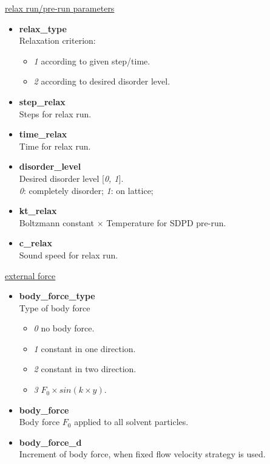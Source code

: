 \documentclass[a4paper,10pt]{article}
\begin{document}
\begin{center}
\underline{\textlangle relax run/pre-run parameters \textrangle}
\end{center}

\begin{itemize}
 
\item 
\textbf{relax\_type}  \\
Relaxation criterion:
\begin{itemize}
 \item 
\textit{1} according to given step/time.
 \item
\textit{2} according to desired disorder level.
\end{itemize}
\item 
\textbf{step\_relax}   \\
Steps for relax run.

\item 
\textbf{time\_relax}   \\
Time for relax run.

\item 
\textbf{disorder\_level} \\
Desired disorder level [\textit{0, 1}].\\
\textit{0}: completely disorder;
\textit{1}: on lattice;


\item 
\textbf{kt\_relax}  \\
Boltzmann constant $\times$ Temperature for SDPD pre-run.

\item 
\textbf{c\_relax}   \\
Sound speed for relax run.

\end{itemize}


\begin{center}
\underline{\textlangle external force \textrangle}
\end{center}

\begin{itemize}
 
\item 
\textbf{body\_force\_type} \\
Type of body force
\begin{itemize}
 \item \textit{0} no body force.
 \item \textit{1} constant in one direction.
 \item \textit{ 2} constant in two direction. 
 \item \textit{3} $F_0\times sin(k \times y)$.
\end{itemize}

\item 
\textbf{body\_force}  \\
Body force $F_0$ applied to all solvent particles.

\item
\textbf{body\_force\_d}    \\
Increment of body force, 
when fixed flow velocity strategy is used.

\end{itemize}
\end{document}
